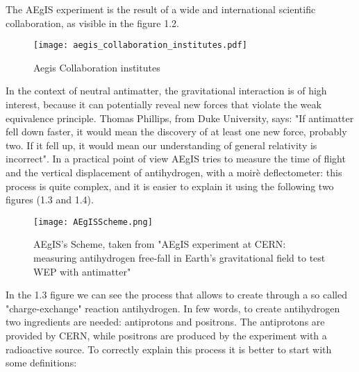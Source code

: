 The AEgIS experiment is the result of a wide and international scientific collaboration, as visible in the figure 1.2.

\begin{figure}[H]
\centering 
\texttt{[image: aegis\_collaboration\_institutes.pdf]} 
\caption{Aegis Collaboration institutes}
\end{figure}


In the context of neutral antimatter, the gravitational interaction is of high interest, because it can potentially reveal new forces that violate the weak equivalence principle. Thomas Phillips, from Duke University, says: "If antimatter fell down faster, it would mean the discovery of at least one new force, probably two. If it fell up, it would mean our understanding of general relativity is incorrect". In a practical point of view AEgIS tries to measure the time of flight and the vertical displacement of antihydrogen, with a moirè deflectometer: this process is quite complex, and it is easier to explain it using the following two figures (1.3 and 1.4).

\begin{figure}[H]
\centering 
\texttt{[image: AEgISScheme.png]} 
\caption{AEgIS's Scheme, taken from "AEgIS experiment at CERN: measuring antihydrogen free-fall in Earth’s gravitational field to test WEP with antimatter"}
\end{figure}

In the 1.3 figure we can see the process that allows to create through a so called "charge-exchange" reaction antihydrogen. In few words, to create antihydrogen two ingredients are needed: antiprotons and positrons. The antiprotons are provided by CERN, while positrons are produced by the experiment with a radioactive source. To correctly explain this process it is better to start with some definitions:


